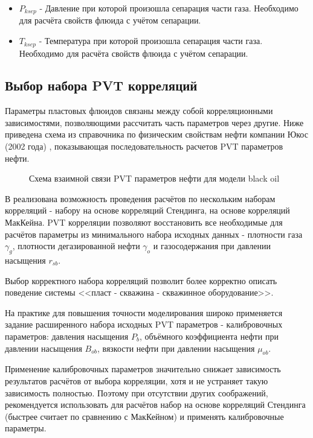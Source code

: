 \begin{itemize}
\item $P_{ksep}$ - Давление при которой произошла сепарация части газа. Необходимо для расчёта свойств флюида с учётом сепарации. 

\item $T_{ksep}$ - Температура при которой произошла сепарация части газа. Необходимо для расчёта свойств флюида с учётом сепарации. 

\end{itemize}

\subsection{Выбор набора PVT корреляций}
Параметры пластовых флюидов связаны между собой корреляционными зависимостями, позволяющими рассчитать часть параметров через другие. Ниже приведена схема из справочника по физическим свойствам нефти компании Юкос (2002 года) \cite{Yukos_PVT_2002}, показывающая последовательность расчетов PVT параметров нефти.

\begin{figure}[H]
	\caption{Схема взаимной связи PVT параметров нефти для модели black oil \cite{Yukos_PVT_2002}}
	\label{ris:PVT_props}
\end{figure}

В \unf{} реализована возможность проведения расчётов по нескольким наборам корреляций - набору на основе корреляций Стендинга, на основе корреляций МакКейна. PVT корреляции позволяют восстановить все необходимые для расчётов параметры из минимального набора исходных данных - плотности газа $\gamma_g$, плотности дегазированной нефти $\gamma_o$ и газосодержания при давлении насыщения $r_{sb}$. 


Выбор корректного набора корреляций позволит более корректно описать поведение системы <<пласт - скважина - скважинное оборудование>>. 

На практике для повышения точности моделирования широко применяется задание расширенного набора исходных PVT параметров - калибровочных параметров: давления насыщения $P_b$, объёмного коэффициента нефти при давлении насыщения $B_{ob}$, вязкости нефти при давлении насыщения $\mu_{ob}$. 

Применение калибровочных параметров значительно снижает зависимость результатов расчётов от выбора корреляции, хотя и не устраняет такую зависимость полностью. Поэтому при отсутствии других соображений, рекомендуется использовать для расчётов набор на основе корреляций Стендинга (быстрее считает по сравнению с МакКейном) и применять калибровочные параметры.

